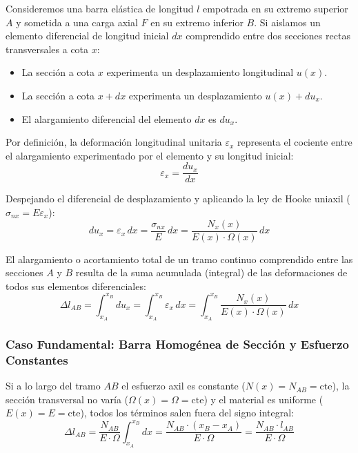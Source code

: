 Consideremos una barra elástica de longitud $l$ empotrada en su extremo superior $A$ y sometida a una carga axial $F$ en su extremo inferior $B$. Si aislamos un elemento diferencial de longitud inicial $dx$ comprendido entre dos secciones rectas transversales a cota $x$:
\begin{itemize}
    \item La sección a cota $x$ experimenta un desplazamiento longitudinal $u(x)$.
    \item La sección a cota $x + dx$ experimenta un desplazamiento $u(x) + du_x$.
    \item El alargamiento diferencial del elemento $dx$ es $du_x$.
\end{itemize}

Por definición, la deformación longitudinal unitaria $\varepsilon_x$ representa el cociente entre el alargamiento experimentado por el elemento y su longitud inicial:
\begin{equation}
    \varepsilon_x = \frac{du_x}{dx}
\end{equation}

Despejando el diferencial de desplazamiento y aplicando la ley de Hooke uniaxil ($\sigma_{nx} = E \varepsilon_x$):
\begin{equation}
    du_x = \varepsilon_x \, dx = \frac{\sigma_{nx}}{E} \, dx = \frac{N_x(x)}{E(x) \cdot \Omega(x)} \, dx
\end{equation}

El alargamiento o acortamiento total de un tramo continuo comprendido entre las secciones $A$ y $B$ resulta de la suma acumulada (integral) de las deformaciones de todos sus elementos diferenciales:
\begin{equation}
    \boxed{\Delta l_{AB} = \int_{x_A}^{x_B} du_x = \int_{x_A}^{x_B} \varepsilon_x \, dx = \int_{x_A}^{x_B} \frac{N_x(x)}{E(x) \cdot \Omega(x)} \, dx}
\end{equation}

\subsubsection{Caso Fundamental: Barra Homogénea de Sección y Esfuerzo Constantes}
Si a lo largo del tramo $AB$ el esfuerzo axil es constante ($N(x) = N_{AB} = \text{cte}$), la sección transversal no varía ($\Omega(x) = \Omega = \text{cte}$) y el material es uniforme ($E(x) = E = \text{cte}$), todos los términos salen fuera del signo integral:
\begin{equation}
    \Delta l_{AB} = \frac{N_{AB}}{E \cdot \Omega} \int_{x_A}^{x_B} dx = \frac{N_{AB} \cdot (x_B - x_A)}{E \cdot \Omega} = \boxed{\frac{N_{AB} \cdot l_{AB}}{E \cdot \Omega}}
\end{equation}

